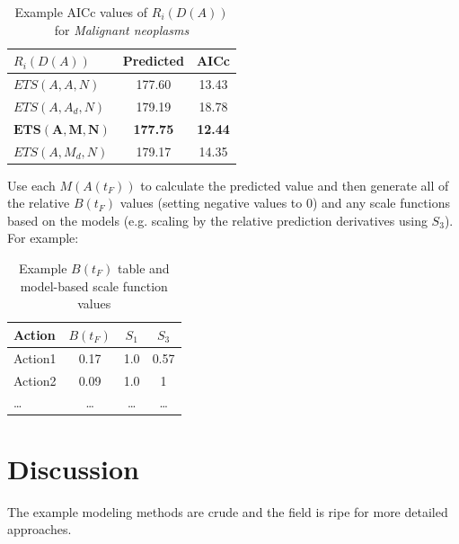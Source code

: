 \documentclass[12pt, a4paper, twocolumn]{article}
\begin{document}
\begin{table}[H]
  \centering
  \begin{tabular}{lcc}
    \toprule
      $R_i(D(A))$       & Predicted       & AICc           \\
    \midrule
      $ETS(A,A,N)$      & 177.60          & 13.43          \\
      $ETS(A,A_d,N)$    & 179.19          & 18.78          \\
      $\bm{ETS(A,M,N)}$ & \textbf{177.75} & \textbf{12.44} \\
      $ETS(A,M_d,N)$    & 179.17          & 14.35          \\
    \bottomrule
  \end{tabular}
  \caption{Example AICc values of $R_i(D(A))$ for \textit{Malignant neoplasms}}
  \label{table:choosem}
\end{table}

Use each $M(A(t_F))$ to calculate the predicted value and then generate all of the relative $B(t_F)$ values (setting negative values to 0) and any scale functions based on the models (e.g. scaling by the relative prediction derivatives using $S_3$). For example:

\begin{table}[H]
  \centering
  \begin{tabular}{lccc}
    \toprule
      Action  & $B(t_F)$ & $S_1$  & $S_3$  \\
    \midrule
      Action1 & 0.17     & 1.0    & 0.57   \\
      Action2 & 0.09     & 1.0    & 1      \\
      \ldots  & \ldots   & \ldots & \ldots \\
    \bottomrule
  \end{tabular}
  \caption{Example $B(t_F)$ table and model-based scale function values}
  \label{table:btable}
\end{table}

\section{Discussion}

The example modeling methods are crude and the field is ripe for more detailed approaches.



\end{document}
